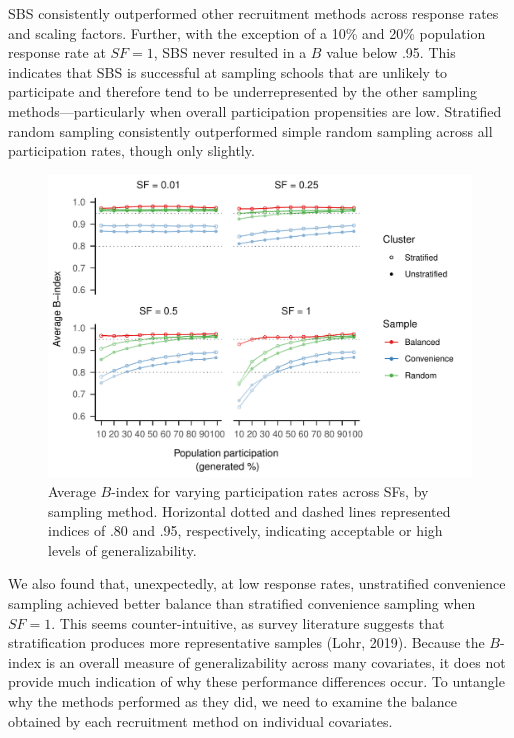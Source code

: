 \documentclass[
  english,
  man,floatsintext]{apa6}
\begin{document}
SBS consistently outperformed other recruitment methods across response rates and scaling factors. Further, with the exception of a 10\% and 20\% population response rate at \(SF = 1\), SBS never resulted in a \(B\) value below .95. This indicates that SBS is successful at sampling schools that are unlikely to participate and therefore tend to be underrepresented by the other sampling methods---particularly when overall participation propensities are low. Stratified random sampling consistently outperformed simple random sampling across all participation rates, though only slightly.



\begin{figure}
\centering
\includegraphics{6---Paper_files/figure-latex/fig-avg-B-1.pdf}
\caption{\label{fig:fig-avg-B}Average \(B\)-index for varying participation rates across SFs, by sampling method. Horizontal dotted and dashed lines represented indices of .80 and .95, respectively, indicating acceptable or high levels of generalizability.}
\end{figure}

We also found that, unexpectedly, at low response rates, unstratified convenience sampling achieved better balance than stratified convenience sampling when \(SF = 1\). This seems counter-intuitive, as survey literature suggests that stratification produces more representative samples (Lohr, 2019). Because the \(B\)-index is an overall measure of generalizability across many covariates, it does not provide much indication of why these performance differences occur. To untangle why the methods performed as they did, we need to examine the balance obtained by each recruitment method on individual covariates.
\end{document}
